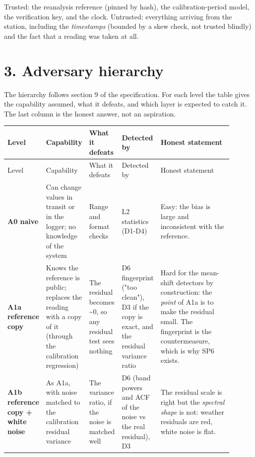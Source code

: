 \documentclass[10pt,a4paper]{article}
\begin{document}
Trusted: the reanalysis reference (pinned by hash), the calibration-\allowbreak{}period model, the verification key, and the clock. Untrusted: everything arriving from the station, including the \emph{timestamps} (bounded by a skew check, not trusted blindly) and the fact that a reading was taken at all.

\section*{3. Adversary hierarchy}
The hierarchy follows section 9 of the specification. For each level the table gives the capability assumed, what it defeats, and which layer is expected to catch it. The last column is the honest answer, not an aspiration.

{\small
\setlength{\tabcolsep}{4.5pt}
\setlength{\LTleft}{\fill}
\setlength{\LTright}{\fill}
\begin{longtable}{>{\raggedright\arraybackslash}p{0.085\linewidth}>{\raggedright\arraybackslash}p{0.143\linewidth}>{\raggedright\arraybackslash}p{0.100\linewidth}>{\raggedright\arraybackslash}p{0.131\linewidth}>{\raggedright\arraybackslash}p{0.438\linewidth}}
\toprule
Level & Capability & What it defeats & Detected by & Honest statement \\
\midrule
\endfirsthead
\toprule
Level & Capability & What it defeats & Detected by & Honest statement \\
\midrule
\endhead
\bottomrule
\endlastfoot
\textbf{A0 naive} & Can change values in transit or in the logger; no knowledge of the system & Range and format checks & L2 statistics (D1-\allowbreak{}D4) & Easy: the bias is large and inconsistent with the reference. \\
\textbf{A1a reference copy} & Knows the reference is public; replaces the reading with a copy of it (through the calibration regression) & The residual becomes \textasciitilde{}0, so any residual test sees nothing & D6 fingerprint ("too clean"), D3 if the copy is exact, and the residual variance ratio & Hard for the mean-\allowbreak{}shift detectors by construction: the \emph{point} of A1a is to make the residual small. The fingerprint is the countermeasure, which is why SP6 exists. \\
\textbf{A1b reference copy + white noise} & As A1a, with noise matched to the calibration residual variance & The variance ratio, if the noise is matched well & D6 (band powers and ACF of the noise vs the real residual), D3 & The residual scale is right but the \emph{spectral shape} is not: weather residuals are red, white noise is flat. \\

\end{longtable}}
\end{document}
